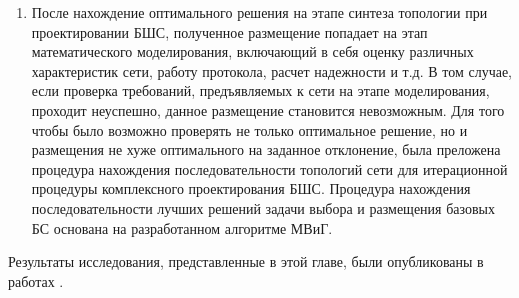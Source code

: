 \begin{enumerate}
  \item После нахождение оптимального решения на этапе синтеза топологии при проектировании БШС, полученное размещение попадает на этап математического моделирования, включающий в себя оценку различных характеристик сети, работу протокола, расчет надежности и т.д. В том случае, если проверка требований, предъявляемых к сети на этапе моделирования, проходит неуспешно, данное размещение становится невозможным. Для того чтобы  было возможно проверять не только оптимальное решение, но и размещения не хуже оптимального на заданное отклонение, была преложена процедура нахождения последовательности топологий сети для итерационной процедуры комплексного проектирования БШС. Процедура нахождения последовательности лучших решений задачи выбора и размещения базовых БС основана на разработанном алгоритме МВиГ.
  
\end{enumerate}



Результаты исследования, представленные в этой главе, были опубликованы в работах \cite{IvanovVAK2019, Ivanov2019, MukhtarovIvanovPershinDCCN2019_RSCI, Mukhtarov2020, VishnevskyMukhtarovPershinDCCN2020_RSCI, LazarevaLarionovMukhtarovITTMM2020_RSCI, VishnevskyLarionovMukhtarovICAM2020_RSCI, MukhtarovSokolovITTMM2021, PershinVAK2022, Larionov2021}.








